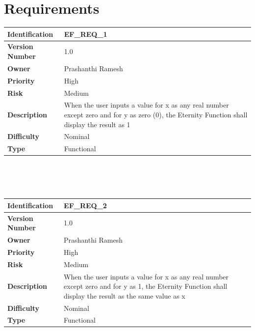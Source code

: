 \documentclass[11pt, english]{report}
\begin{document}
\section{Requirements}

\setlength{\tabcolsep}{18pt}
\renewcommand{\arraystretch}{1.5}
\begin{tabular}{ |p{2.2cm}|p{9.8cm}| }
\hline
\textbf{Identification} &  EF\_REQ\_1 \\ \hline 
\textbf{Version Number} & 1.0 \\ \hline 
\textbf{Owner} & Prashanthi Ramesh  \\ \hline
\textbf{Priority} & High  \\ \hline
\textbf{Risk} & Medium  \\ \hline
\textbf{Description} & When the user inputs a value for x as any real number except zero and for y as zero (0), the Eternity Function shall display the result as 1\\ \hline
\textbf{Difficulty} & Nominal  \\ \hline
\textbf{Type} & Functional \\ 
\hline
\end{tabular} \\ \\ \\

\setlength{\tabcolsep}{18pt}
\renewcommand{\arraystretch}{1.5}
\begin{tabular}{ |p{2.2cm}|p{9.8cm}| }
\hline
\textbf{Identification} &  EF\_REQ\_2 \\ \hline 
\textbf{Version Number} & 1.0 \\ \hline 
\textbf{Owner} & Prashanthi Ramesh  \\ \hline
\textbf{Priority} & High  \\ \hline
\textbf{Risk} & Medium  \\ \hline
\textbf{Description} & When the user inputs a value for x as any real number except zero and for y as 1, the Eternity Function shall display the result as the same value as x\\ \hline
\textbf{Difficulty} & Nominal  \\ \hline
\textbf{Type} & Functional \\ 
\hline
\end{tabular}  \\ \\ \\ 
\end{document}
